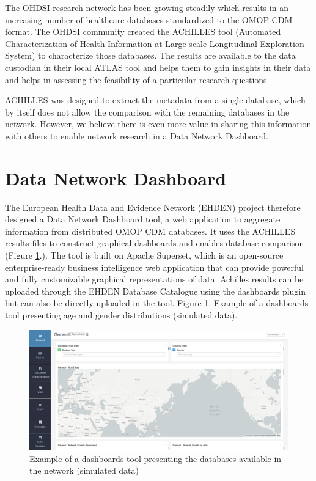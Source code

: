 \documentclass[]{book}
\begin{document}
The OHDSI research network has been growing steadily which results in an
increasing number of healthcare databases standardized to the OMOP CDM
format. The OHDSI community created the ACHILLES tool (Automated
Characterization of Health Information at Large-scale Longitudinal
Exploration System) to characterize those databases. The results are
available to the data custodian in their local ATLAS tool and helps them
to gain insights in their data and helps in assessing the feasibility of
a particular research questions.

ACHILLES was designed to extract the metadata from a single database,
which by itself does not allow the comparison with the remaining
databases in the network. However, we believe there is even more value
in sharing this information with others to enable network research in a
Data Network Dashboard.

\section{Data Network Dashboard}\label{data-network-dashboard}

The European Health Data and Evidence Network (EHDEN) project therefore
designed a Data Network Dashboard tool, a web application to aggregate
information from distributed OMOP CDM databases. It uses the ACHILLES
results files to construct graphical dashboards and enables database
comparison (Figure \ref{fig:cdmBI}.). The tool is built on Apache
Superset, which is an open-source enterprise-ready business intelligence
web application that can provide powerful and fully customizable
graphical representations of data. Achilles results can be uploaded
through the EHDEN Database Catalogue using the dashboards plugin but can
also be directly uploaded in the tool. Figure 1. Example of a dashboards
tool presenting age and gender distributions (simulated data).

\begin{figure}
\includegraphics[width=1\linewidth]{images/cdmBI} \caption{Example of a dashboards tool presenting the databases available in the network (simulated data)}\label{fig:cdmBI}
\end{figure}
\end{document}
